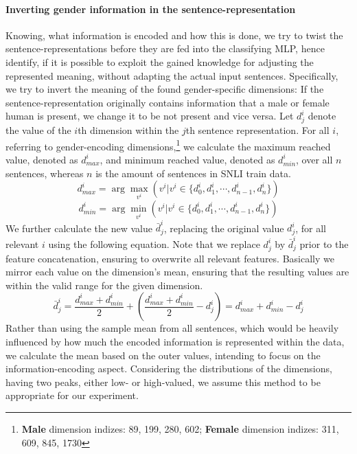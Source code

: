 \paragraph*{Inverting gender information in the sentence-representation}
Knowing, what information is encoded and how this is done, we try to twist the sentence-representations before they are fed into the classifying \ac{MLP}, hence identify, if it is possible to exploit the gained knowledge for adjusting the represented meaning, without adapting the actual input sentences. Specifically, we try to invert the meaning of the found gender-specific dimensions: If the sentence-representation originally contains information that a male or female human is present, we change it to be not present and vice versa. Let $d^i_j$ denote the value of the $i$th dimension within the $j$th sentence representation. For all $i$, referring to gender-encoding dimensions,\footnote{\textbf{Male} dimension indizes: 89, 199, 280, 602; \textbf{Female} dimension indizes: 311, 609, 845, 1730} we calculate the maximum reached value, denoted as $d^i_{max}$, and minimum reached value, denoted as $d^i_{min}$, over all $n$ sentences, whereas $n$ is the amount of sentences in \ac{SNLI} train data.
\begin{equation}
d^i_{max} = \arg\max_{v^i}(v^i | v^i \in \{d^i_0, d^i_1, \cdots,d^i_{n-1}, d^i_n\})
\end{equation}
\begin{equation}
d^i_{min} = \arg\min_{v^i}(v^i | v^i \in \{d^i_0, d^i_1, \cdots,d^i_{n-1}, d^i_n\})
\end{equation}
We further calculate the new value $\bar{d}^i_j$, replacing the original value $d^i_j$, for all relevant $i$ using the following equation. Note that we replace $d^i_j$ by $\bar{d}^i_j$ prior to the feature concatenation, ensuring to overwrite all relevant features. Basically we mirror each value on the dimension's mean, ensuring that the resulting values are within the valid range for the given dimension.
\begin{equation}\label{eq:invert}
\bar{d}^i_j = \frac{d^i_{max} + d^i_{min}}{2} + \left(\frac{d^i_{max} + d^i_{min}}{2} - d^i_j\right) = d^i_{max} + d^i_{min} - d^i_j
\end{equation}
Rather than using the sample mean from all sentences, which would be heavily influenced by how much the encoded information is represented within the data, we calculate the mean based on the outer values, intending to focus on the information-encoding aspect. Considering the distributions of the dimensions, having two peaks, either low- or high-valued, we assume this method to be appropriate for our experiment.

